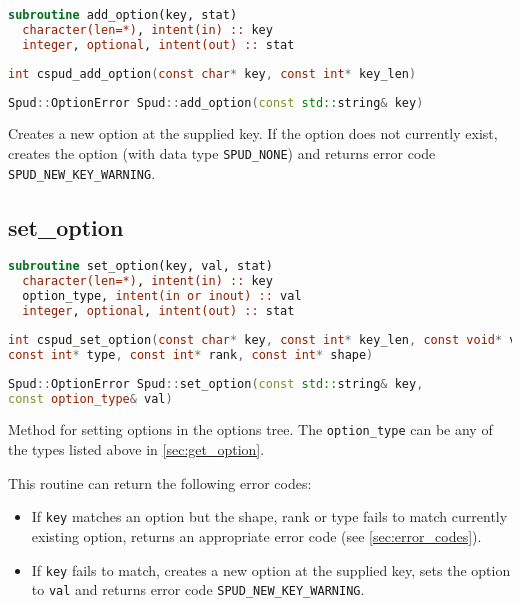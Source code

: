 \documentclass[a4paper, 11pt]{book}
\begin{document}
\begin{lstlisting}[language=fortran]
subroutine add_option(key, stat)
  character(len=*), intent(in) :: key
  integer, optional, intent(out) :: stat
\end{lstlisting}

\begin{lstlisting}[language=C]
int cspud_add_option(const char* key, const int* key_len)
\end{lstlisting}

\begin{lstlisting}[language=C++]
Spud::OptionError Spud::add_option(const std::string& key)
\end{lstlisting}

Creates a new option at the supplied key. If the option does not currently
exist, creates the option (with data type \lstinline+SPUD_NONE+) and
returns error code \lstinline+SPUD_NEW_KEY_WARNING+.

\subsection{set\_option}\label{sec:set_option}

\begin{lstlisting}[language=fortran,emph=option_type,emphstyle=\textit]
subroutine set_option(key, val, stat)
  character(len=*), intent(in) :: key
  option_type, intent(in or inout) :: val
  integer, optional, intent(out) :: stat
\end{lstlisting}

\begin{lstlisting}[language=C,emph=option_type,emphstyle=\textit]
int cspud_set_option(const char* key, const int* key_len, const void* val,
const int* type, const int* rank, const int* shape)
\end{lstlisting}

\begin{lstlisting}[language=C++,emph=option_type,emphstyle=\textit]
Spud::OptionError Spud::set_option(const std::string& key,
const option_type& val)
\end{lstlisting}

Method for setting options in the options tree. The
\lstinline[emph=option_type,emphstyle=\textit]+option_type+ can be any of the
types listed above in \ref{sec:get_option}.

This routine can return the following error codes:
\begin{itemize}
\item If \lstinline+key+ matches an option but the shape, rank or type fails
  to match currently existing option, returns an appropriate error code (see
  \ref{sec:error_codes}).
\item If \lstinline+key+ fails to match, creates a new option at the supplied
  key, sets the option to \lstinline+val+ and returns error code
  \lstinline+SPUD_NEW_KEY_WARNING+.
\end{itemize}
\end{document}
